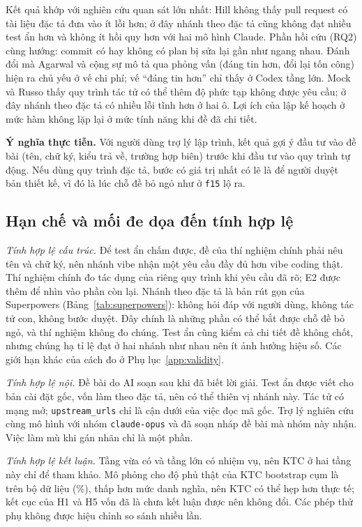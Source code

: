 Kết quả khớp với nghiên cứu quan sát lớn nhất: Hill \cite{hill_2026} không thấy pull request có tài liệu đặc tả
đưa vào ít lỗi hơn; ở đây nhánh theo đặc tả cũng không đạt nhiều test ẩn hơn và không ít hồi quy hơn với hai mô
hình Claude. Phần hồi cứu (RQ2) cùng hướng: commit có hay không có plan bị sửa lại gần như ngang nhau. Đánh đổi
mà Agarwal và cộng sự \cite{agarwal_2026} mô tả qua phỏng vấn (đáng tin hơn, đổi lại tốn công) hiện ra chủ yếu
ở vế chi phí; vế ``đáng tin hơn'' chỉ thấy ở Codex tầng lớn. Mock và Russo \cite{mock_2026} thấy quy trình tác
tử có thể thêm độ phức tạp không được yêu cầu; ở đây nhánh theo đặc tả có nhiều lỗi tĩnh hơn ở hai ô. Lợi ích
của lập kế hoạch ở mức hàm \cite{jiang_2024} không lặp lại ở mức tính năng khi đề đã chi tiết.

\textbf{Ý nghĩa thực tiễn.} Với người dùng trợ lý lập trình, kết quả gợi ý đầu tư vào đề bài (tên, chữ ký,
kiểu trả về, trường hợp biên) trước khi đầu tư vào quy trình tự động. Nếu dùng quy trình đặc tả, bước có giá
trị nhất có lẽ là để người duyệt bản thiết kế, vì đó là lúc chỗ đề bỏ ngỏ như ở \texttt{f15} lộ ra.

\subsection{Hạn chế và mối đe dọa đến tính hợp lệ}\label{sec:threats}

\textit{Tính hợp lệ cấu trúc.} Để test ẩn chấm được, đề của thí nghiệm chính phải nêu tên và chữ ký, nên nhánh
vibe nhận một yêu cầu đầy đủ hơn vibe coding thật. Thí nghiệm chính đo tác dụng của riêng quy trình khi yêu cầu
đã rõ; E2 được thêm để nhìn vào phần còn lại. Nhánh theo đặc tả là bản rút gọn của Superpowers
(Bảng~\ref{tab:superpowers}): không hỏi đáp với người dùng, không tác tử con, không bước duyệt. Đây chính là
những phần có thể bắt được chỗ đề bỏ ngỏ, và thí nghiệm không đo chúng. Test ẩn cũng kiểm cả chi tiết đề không
chốt, nhưng chúng hạ tỉ lệ đạt ở hai nhánh như nhau nên ít ảnh hưởng hiệu số. Các giới hạn khác của cách đo ở
Phụ lục~\ref{app:validity}.

\textit{Tính hợp lệ nội.} Đề bài do AI soạn sau khi đã biết lời giải. Test ẩn được viết cho bản cài đặt gốc,
vốn làm theo đặc tả, nên có thể thiên vị nhánh này. Tác tử có mạng mở; \texttt{upstream\_urls} chỉ là cận dưới
của việc đọc mã gốc. Trợ lý nghiên cứu cùng mô hình với nhóm \texttt{claude-opus} và đã soạn nháp đề bài mà nhóm
này nhận. Việc làm mù khi gán nhãn chỉ là một phần.

\textit{Tính hợp lệ kết luận.} Tầng vừa có \NumMediumTasks{} và tầng lớn có \NumFeatureTasks{} nhiệm vụ, nên
KTC ở hai tầng này chỉ để tham khảo. Mô phỏng cho độ phủ thật của KTC bootstrap cụm là \NumResCoverageHits{} trên
\NumResCoverageSets{} bộ dữ liệu (\NumResCoveragePct{}\%), thấp hơn mức danh nghĩa, nên KTC có thể hẹp hơn thực
tế; kết cục của H1 và H5 vốn đã là chưa kết luận được nên không đổi. Các phép thử phụ không được hiệu chỉnh so
sánh nhiều lần.

